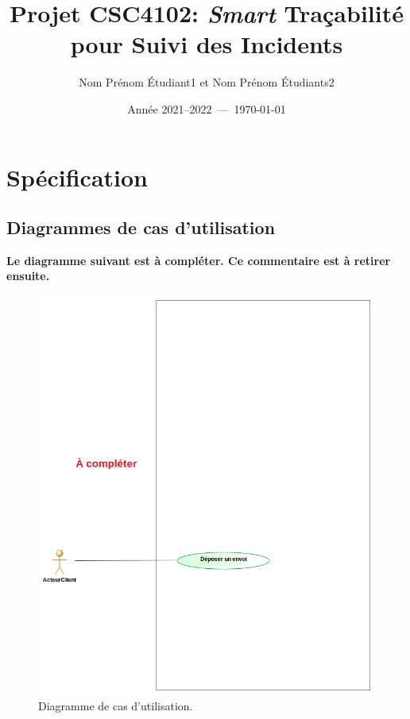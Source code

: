 \documentclass[11pt,article]{article}
\begin{document}
\title{Projet CSC4102: \textit{Smart} Traçabilité pour Suivi des Incidents}
\author{Nom Prénom Étudiant1 et Nom Prénom Étudiants2}
\date{Année 2021--2022~---~\today}
\maketitle

\vfill

\tableofcontents

\newpage

\section{Spécification}

\subsection{Diagrammes de cas d'utilisation}

{\noindent\color{red}\textbf{Le diagramme suivant est à compléter. Ce
    commentaire est à retirer ensuite.}}

\begin{figure}[!ht]
\begin{center}
\includegraphics[scale=0.6]{Diagrammes/smarttsi_uml_diag_cas_utilisation}
\caption{Diagramme de cas d'utilisation.}
\end{center}
\label{usecase_modelio}
\end{figure}
\end{document}
